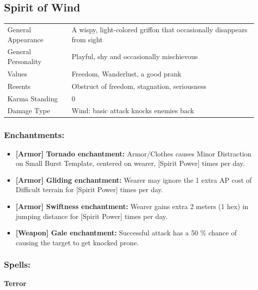\documentclass[11pt,a4paper,twocolumn]{book}
\begin{document}
\subsection*{Spirit of Wind}
{
	\begin{tabu} to 75mm{| X[l,4] | X[l,8] |}
		\hline
		General Appearance		& A wispy, light-colored griffon that occasionally disappears from sight		\\
        General Personality	   	& Playful, shy and occasionally mischievous		\\
        Values     				& Freedom, Wanderlust, a good prank		\\
        Resents     			& Obstruct of freedom, stagnation, seriousness 		\\
        Karma Standing      	& 0		\\
        Damage Type 			& Wind: basic attack knocks enemies back	 	\\ \hline
	\end{tabu}
		
}

\medskip

\subsubsection*{Enchantments:}

\begin{itemize}
\item \textbf{ [Armor] Tornado enchantment:} Armor/Clothes causes Minor Distraction on Small Burst Template, centered on wearer, [Spirit Power] times per day.
	\item \textbf{ [Armor] Gliding enchantment:} Wearer may ignore the 1 extra AP cost of Difficult terrain for [Spirit Power] times per day.
	\item \textbf{ [Armor] Swiftness enchantment:} Wearer gains extra 2 meters (1 hex) in jumping distance for [Spirit Power] times per day.
	\item \textbf{ [Weapon] Gale enchantment:} Successful attack has a 50 \% chance of causing the target to get knocked prone.
\end{itemize}

\subsubsection*{Spells:}

\smallskip
\noindent
\textbf{Terror}
\end{document}
